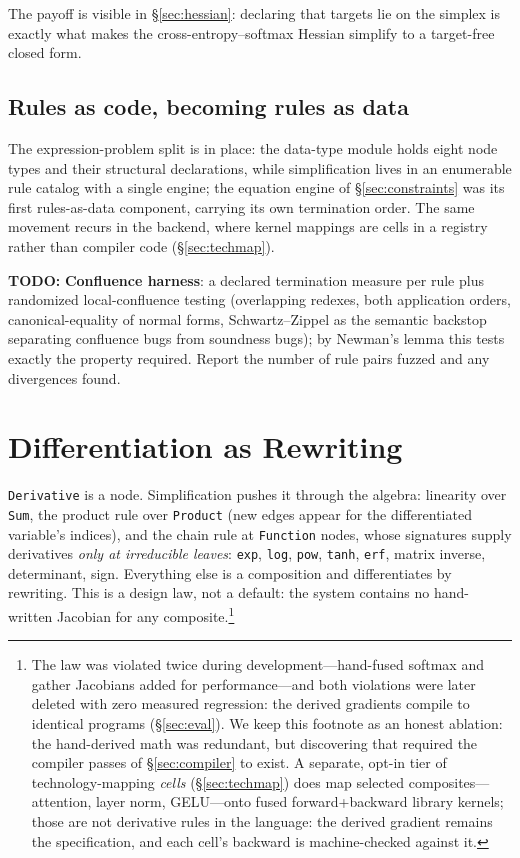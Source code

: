 \documentclass[sigplan,10pt,review]{acmart}
\newcommand{\todopaper}[1]{\par\noindent\colorbox{orange!25}{%
  \parbox{\dimexpr\linewidth-2\fboxsep}{\textbf{TODO:} #1}}\par}
\begin{document}
The payoff is visible in \S\ref{sec:hessian}: declaring that targets lie
on the simplex is exactly what makes the cross-entropy--softmax Hessian
simplify to a target-free closed form.

\subsection{Rules as code, becoming rules as data}\label{sec:rules-as-data}

The expression-problem split is in place: the data-type module holds
eight node types and their structural declarations, while simplification
lives in an enumerable rule catalog with a single engine; the equation
engine of \S\ref{sec:constraints} was its first rules-as-data component,
carrying its own termination order. The same movement recurs in the
backend, where kernel mappings are cells in a registry rather than
compiler code (\S\ref{sec:techmap}).

\todopaper{\textbf{Confluence harness}: a declared
termination measure per rule plus randomized local-confluence testing
(overlapping redexes, both application orders, canonical-equality of
normal forms, Schwartz--Zippel as the semantic backstop separating
confluence bugs from soundness bugs); by Newman's lemma \cite{newman1942} this tests exactly
the property required. Report the number of rule pairs fuzzed and any
divergences found.}

\section{Differentiation as Rewriting}\label{sec:autodiff}

\texttt{Derivative} is a node. Simplification pushes it through the
algebra: linearity over \texttt{Sum}, the product rule over
\texttt{Product} (new edges appear for the differentiated variable's
indices), and the chain rule at \texttt{Function} nodes, whose signatures
supply derivatives \emph{only at irreducible leaves}: \texttt{exp},
\texttt{log}, \texttt{pow}, \texttt{tanh}, \texttt{erf}, matrix inverse,
determinant, sign. Everything else is a composition and differentiates by
rewriting. This is a design law, not a default: the system contains no
hand-written Jacobian for any composite.\footnote{The law was violated
twice during development---hand-fused softmax and gather Jacobians added
for performance---and both violations were later deleted with zero
measured regression: the derived gradients compile to identical programs
(\S\ref{sec:eval}). We keep this footnote as an honest ablation: the
hand-derived math was redundant, but discovering that required the
compiler passes of \S\ref{sec:compiler} to exist. A separate, opt-in
tier of technology-mapping \emph{cells} (\S\ref{sec:techmap}) does map
selected composites---attention, layer norm, GELU---onto fused
forward+backward library kernels; those are not derivative rules in the
language: the derived gradient remains the specification, and each
cell's backward is machine-checked against it.}
\end{document}
